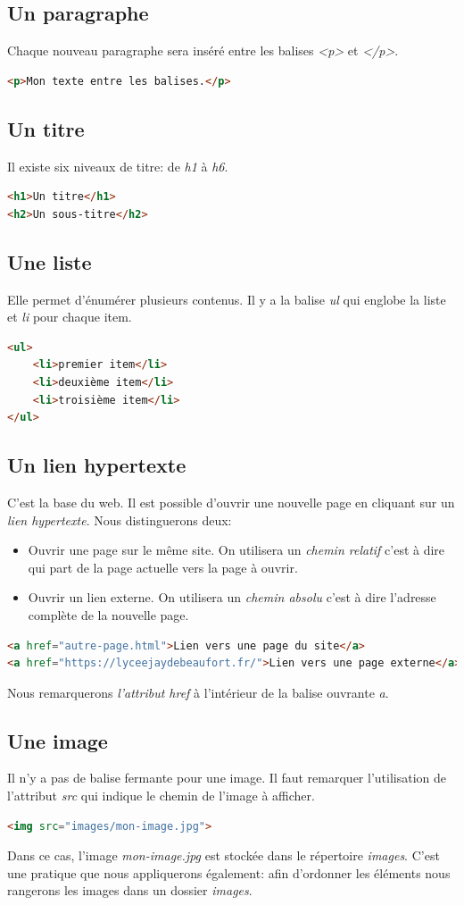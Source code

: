 \documentclass[a4paper,11pt]{article}
\begin{document}
\begin{Form}
\subsection{Un paragraphe}
Chaque nouveau paragraphe sera inséré entre les balises \emph{<p>} et \emph{</p>}.
\begin{lstlisting}[language=html]
<p>Mon texte entre les balises.</p>
\end{lstlisting}
\subsection{Un titre}
Il existe six niveaux de titre: de \emph{h1} à \emph{h6}.
\begin{lstlisting}[language=html]
<h1>Un titre</h1>
<h2>Un sous-titre</h2>
\end{lstlisting}
\subsection{Une liste}
Elle permet d'énumérer plusieurs contenus. Il y a la balise \emph{ul} qui englobe la liste et \emph{li} pour chaque item.
\begin{lstlisting}[language=html]
<ul>
	<li>premier item</li>
	<li>deuxième item</li>
	<li>troisième item</li>
</ul>
\end{lstlisting}
\subsection{Un lien hypertexte}
C'est la base du web. Il est possible d'ouvrir une nouvelle page en cliquant sur un \emph{lien hypertexte}. Nous distinguerons deux:
\begin{itemize}
\item Ouvrir une page sur le même site. On utilisera un \emph{chemin relatif} c'est à dire qui part de la page actuelle vers la page à ouvrir.
\item Ouvrir un lien externe. On utilisera un \emph{chemin absolu} c'est à dire l'adresse complète de la nouvelle page.
\end{itemize}
\begin{lstlisting}[language=html]
<a href="autre-page.html">Lien vers une page du site</a>
<a href="https://lyceejaydebeaufort.fr/">Lien vers une page externe</a>
\end{lstlisting}
Nous remarquerons \emph{l'attribut href} à l'intérieur de la balise ouvrante \emph{a}.
\subsection{Une image}
Il n'y a pas de balise fermante pour une image. Il faut remarquer l'utilisation de l'attribut \emph{src} qui indique le chemin de l'image à afficher.
\begin{lstlisting}[language=html]
<img src="images/mon-image.jpg">
\end{lstlisting}
Dans ce cas, l'image \emph{mon-image.jpg} est stockée dans le répertoire \emph{images}. C'est une pratique que nous appliquerons également: afin d'ordonner les éléments nous rangerons les images dans un dossier \emph{images}.

\end{Form}
\end{document}
